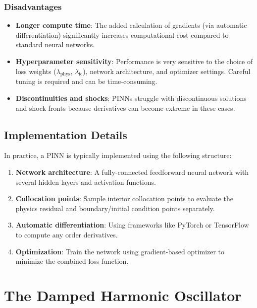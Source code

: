 \documentclass[12pt, a4paper]{report}
\begin{document}
\subsubsection*{Disadvantages}
\begin{itemize}[label=$-$]
    \item \textbf{Longer compute time}: The added calculation of gradients (via automatic differentiation) significantly increases computational cost compared to standard neural networks.
    \item \textbf{Hyperparameter sensitivity}: Performance is very sensitive to the choice of loss weights ($\lambda_{\text{phys}}$, $\lambda_{\text{ic}}$), network architecture, and optimizer settings. Careful tuning is required and can be time-consuming.
    \item \textbf{Discontinuities and shocks}: PINNs struggle with discontinuous solutions and shock fronts because derivatives can become extreme in these cases.
\end{itemize}
\subsection{Implementation Details}

In practice, a PINN is typically implemented using the following structure:

\begin{enumerate}
    \item \textbf{Network architecture}: A fully-connected feedforward neural network with several hidden layers and activation functions.
    \item \textbf{Collocation points}: Sample interior collocation points to evaluate the physics residual and boundary/initial condition points separately.    
    \item \textbf{Automatic differentiation}: Using frameworks like PyTorch or TensorFlow to compute any order derivatives.
    \item \textbf{Optimization}: Train the network using gradient-based optimizer to minimize the combined loss function.
\end{enumerate}


\section{The Damped Harmonic Oscillator}
\end{document}
